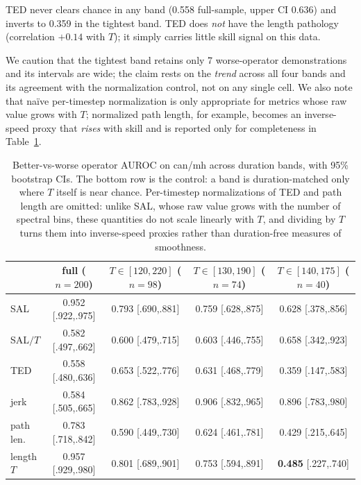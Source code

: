 \documentclass[10pt]{article}
\begin{document}
TED never clears chance in any band (0.558 full-sample, upper CI 0.636)
and inverts to 0.359 in the tightest band. TED does \emph{not}
have the length pathology (correlation $+0.14$ with $T$); it simply carries
little skill signal on this data.

We caution that the tightest band retains only 7 worse-operator
demonstrations and its intervals are wide; the claim rests on the
\emph{trend} across all four bands and its agreement with the normalization
control, not on any single cell. We also note that na\"ive per-timestep
normalization is only appropriate for metrics whose raw value grows with
$T$; normalized path length, for example, becomes an inverse-speed proxy
that \emph{rises} with skill and is reported only for completeness in
Table~\ref{tab:bands}.

\begin{table}[t]
\centering
\small
\begin{tabular}{lcccc}
\toprule
& full ($n{=}200$) & $T \in [120,220]$ ($n{=}98$) & $T \in [130,190]$ ($n{=}74$) & $T \in [140,175]$ ($n{=}40$) \\
\midrule
SAL       & 0.952 [.922,.975] & 0.793 [.690,.881] & 0.759 [.628,.875] & 0.628 [.378,.856] \\
SAL$/T$   & 0.582 [.497,.662] & 0.600 [.479,.715] & 0.603 [.446,.755] & 0.658 [.342,.923] \\
TED       & 0.558 [.480,.636] & 0.653 [.522,.776] & 0.631 [.468,.779] & 0.359 [.147,.583] \\
jerk      & 0.584 [.505,.665] & 0.862 [.783,.928] & 0.906 [.832,.965] & 0.896 [.783,.980] \\
path len. & 0.783 [.718,.842] & 0.590 [.449,.730] & 0.624 [.461,.781] & 0.429 [.215,.645] \\
\midrule
length $T$ & 0.957 [.929,.980] & 0.801 [.689,.901] & 0.753 [.594,.891] & \textbf{0.485} [.227,.740] \\
\bottomrule
\end{tabular}
\caption{Better-vs-worse operator AUROC on can/mh across duration bands,
with 95\% bootstrap CIs. The bottom row is the control: a band is
duration-matched only where $T$ itself is near chance. Per-timestep
normalizations of TED and path length are omitted: unlike SAL, whose raw
value grows with the number of spectral bins, these quantities do not scale
linearly with $T$, and dividing by $T$ turns them into inverse-speed
proxies rather than duration-free measures of smoothness.}
\label{tab:bands}
\end{table}
\end{document}
